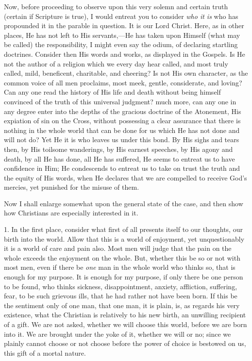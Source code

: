 Now, before proceeding to observe upon this very solemn and certain
truth (certain if Scripture is true), I would entreat you to consider \emph{who
it is} who has propounded it in the parable in question. It is our
Lord Christ. Here, as in other places, He has not left to His
servants,—He has taken upon Himself (what may be called) the
responsibility, I might even say the odium, of declaring startling
doctrines. Consider then His words and works, as displayed in the
Gospels. Is He not the author of a religion which we every day hear
called, and most truly called, mild, beneficent, charitable, and
cheering? Is not His own character, as the common voice of all men
proclaims, most meek, gentle, considerate, and loving? Can any one
read the history of His life and death without being himself convinced
of the truth of this universal judgment? much more, can any one in any
degree enter into the depths of the gracious doctrine of the
Atonement, His expiation of sin on the Cross, without possessing a
clear assurance that there is nothing in the whole world that can be
done for us which He has not done and will not do? Yet He it is who
leaves us under this bond. By His sighs and tears then, by His
toilsome wanderings, by His earnest speeches, by His agony and death,
by all He has done, all He has suffered, He seems to entreat us to
have confidence in Him; He condescends to entreat us to take on trust
the truth and the equity of His words, when He declares that we are
compelled to receive God's mercies, yet punished for the misuse of
them.

Now I shall enlarge somewhat upon the general state of the case,
and then show how Christians are especially interested in it.

1. In the first place, consider what first of all presents itself
to our thoughts, our birth into the world. Allow that this is a world
of enjoyment, yet unquestionably it is a world of care and pain also.
Most men will judge that the pain on the whole exceeds the enjoyment
on the whole. But, whether this be so or not with most men, even if
there be \emph{one} man in the whole world who thinks so, that is
enough for my purpose. It is enough for my purpose, if only there be
one person to be found, who thinks sickness, disappointment, anxiety,
affliction, suffering, fear, to be such grievous ills, that he had
rather not have been born. If this be the sentiment only of one man,
that one man, it is plain, is, as regards his very existence, what the
Christian is relatively to his new birth, an unwilling recipient of a
gift. We are not asked, whether we will choose this world, before we
are born into it. We are brought under the yoke of it, whether we will
or no; since we plainly cannot choose or not choose before the power
of choice is bestowed on us, this gift of a mortal nature.


